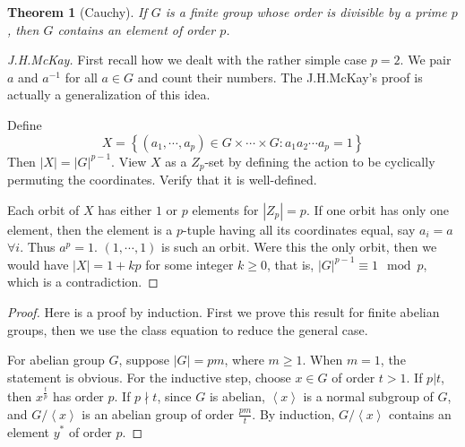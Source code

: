 \documentclass{article}
\newtheorem{Thm}{Theorem}[section]
\theoremstyle{definition}
\begin{document}
\begin{Thm}[Cauchy]
If $G$ is a finite group whose order is divisible by a prime $p$, then $G$ contains an element of order $p$.
\end{Thm}
\begin{proof}[J.H.McKay]
First recall how we dealt with the rather simple case $p=2$. We pair $a$ and $a^{-1}$ for all $a\in G$ and count their numbers.
The J.H.McKay's proof is actually a generalization of this idea.\par 
Define \[X=\left\{(a_1,\cdots,a_p)\in G\times\cdots\times G:a_1a_2\cdots a_p=1\right\}\]
Then $\left|X\right|=\left|G\right|^{p-1}$. View $X$ as a $Z_p$-set by defining the action to be cyclically permuting the coordinates.
Verify that it is well-defined. \par 
Each orbit of $X$ has either $1$ or $p$ elements for $\left|Z_p\right|=p$. If one orbit has only one element, then the element is a $p$-tuple having all its coordinates equal, say $a_i=a$ $\forall i$.
Thus $a^p=1$. $(1,\cdots,1)$ is such an orbit. Were this the only orbit, then we would have $\left|X\right|=1+kp$ for some integer $k\ge 0$, that is, $\left|G\right|^{p-1}\equiv 1\mod{p}$, which is a contradiction.
\end{proof}
\begin{proof}
Here is a proof by induction. First we prove this result for finite abelian groups, then we use the class equation to reduce the general case.\par 
For abelian group $G$, suppose $\left|G\right|=pm$, where $m\ge 1$. When $m=1$, the statement is obvious. For the inductive step,
choose $x\in G$ of order $t>1$. If $p|t$, then $x^{\frac{t}{p}}$ has order $p$. If $p\nmid t$, since $G$ is abelian, $\left\langle x\right\rangle$ is a normal subgroup of $G$,
and $G/\left\langle x\right\rangle$ is an abelian group of order $\frac{pm}{t}$. By induction, $G/\left\langle x\right\rangle$ contains an element $y^*$ of order $p$.
\end{proof}
\end{document}
